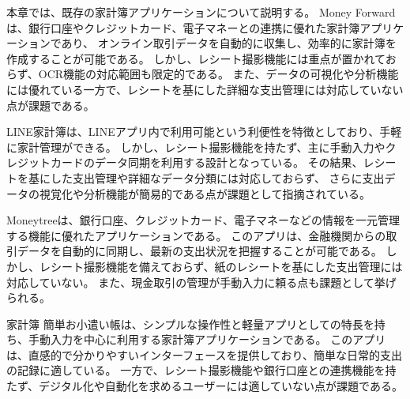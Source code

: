 \documentclass[main]{subfiles}
\begin{document}


本章では、既存の家計簿アプリケーションについて説明する。
Money Forward\cite{MoneyForwardApp}は、銀行口座やクレジットカード、電子マネーとの連携に優れた家計簿アプリケーションであり、
オンライン取引データを自動的に収集し、効率的に家計簿を作成することが可能である。
しかし、レシート撮影機能には重点が置かれておらず、OCR機能の対応範囲も限定的である。
また、データの可視化や分析機能には優れている一方で、レシートを基にした詳細な支出管理には対応していない点が課題である。

LINE家計簿\cite{LINEKakeibo}は、LINEアプリ内で利用可能という利便性を特徴としており、手軽に家計管理ができる。
しかし、レシート撮影機能を持たず、主に手動入力やクレジットカードのデータ同期を利用する設計となっている。
その結果、レシートを基にした支出管理や詳細なデータ分類には対応しておらず、
さらに支出データの視覚化や分析機能が簡易的である点が課題として指摘されている。

Moneytree\cite{MoneytreeApp}は、銀行口座、クレジットカード、電子マネーなどの情報を一元管理する機能に優れたアプリケーションである。
このアプリは、金融機関からの取引データを自動的に同期し、最新の支出状況を把握することが可能である。
しかし、レシート撮影機能を備えておらず、紙のレシートを基にした支出管理には対応していない。
また、現金取引の管理が手動入力に頼る点も課題として挙げられる。

家計簿 簡単お小遣い帳\cite{KakeiboSimpleApp}は、シンプルな操作性と軽量アプリとしての特長を持ち、手動入力を中心に利用する家計簿アプリケーションである。
このアプリは、直感的で分かりやすいインターフェースを提供しており、簡単な日常的支出の記録に適している。
一方で、レシート撮影機能や銀行口座との連携機能を持たず、デジタル化や自動化を求めるユーザーには適していない点が課題である。
\end{document}
